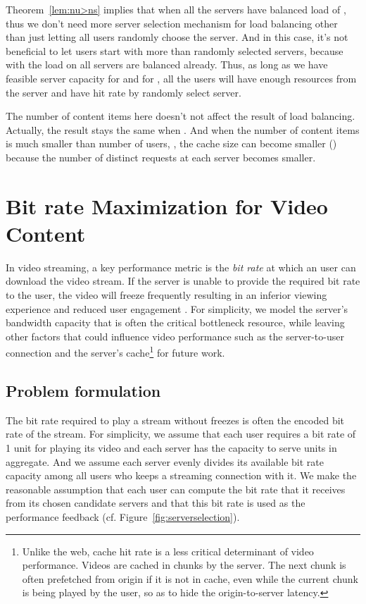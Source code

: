 \documentclass[conference]{IEEEtran}
\begin{document}
Theorem~\ref{lem:nu>ns} implies that when  all the servers have balanced load of , thus we don't need more server selection mechanism for load balancing other than just letting all users randomly choose the server. And in this case, it's not beneficial to let users start with more than  randomly selected servers, because with  the load on all servers are balanced already. Thus, as long as we have feasible server capacity  for  and  for , all the users will have enough resources from the server and have  hit rate by randomly select  server.

The number of content items  here doesn't not affect the result of load balancing. Actually, the result stays the same when . And when the number of content items is much smaller than number of users, , the cache size can become smaller () because the number of distinct requests at each server becomes smaller.

\section{Bit rate Maximization for Video Content}
\label{sec:maxbitrate}
In video streaming, a key performance metric is the {\em bit rate} at which an user can download the video stream. If the server is unable to provide the required bit rate  to the user, the video will freeze frequently resulting in an inferior viewing experience and reduced user engagement \cite{KrishnanS12}.  For simplicity, we model the server's bandwidth capacity that is often the critical bottleneck  resource, while leaving other factors that could  influence video performance such as the server-to-user connection and the server's cache\footnote{Unlike the web, cache hit rate is a less critical determinant of  video performance. Videos are cached in chunks by the server. The next chunk is often prefetched from origin if it is not  in cache, even while the current chunk is being played by the user,  so as to hide the origin-to-server latency.} for future work. 

\subsection{Problem formulation}
The bit rate required to play a stream without freezes is often the encoded  bit rate of the stream. For simplicity, we assume that each user requires a bit rate of 1 unit for playing its video and each server has the capacity to serve  units in aggregate. And we assume each server evenly divides its available bit rate capacity among all users who keeps a streaming connection with it. We make the reasonable assumption that each user can compute the bit rate that it receives from its chosen candidate servers and that this bit rate is used as the performance feedback (cf. Figure~\ref{fig:serverselection}).
\end{document}
